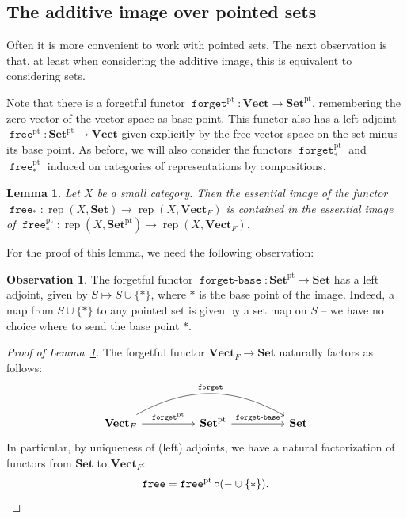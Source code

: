 \documentclass[a4paper]{amsart}
\theoremstyle{plain}
\newtheorem{lemma}[theorem]{Lemma}
\theoremstyle{definition}
\newtheorem{observation}[theorem]{Observation}
\theoremstyle{remark}
\newcommand{\funct}[1]{\operatorname{\mathtt{#1}}}
\newcommand{\Set}{\mathbf{Set}}
\newcommand{\pSet}{\mathbf{Set}^\mathrm{pt}}
\newcommand{\Vect}{\mathbf{Vect}}
\newcommand{\VectF}{\mathbf{Vect}_F}
\DeclareMathOperator{\rep}{rep}
\begin{document}
\subsection{The additive image over pointed sets} \label{subsect.pointed_sets}
Often it is more convenient to work with pointed sets. The next observation is that, at least when considering the additive image, this is equivalent to considering sets.

Note that there is a forgetful functor \( \funct{forget}^\mathrm{pt} \colon \Vect \to \pSet \), remembering the zero vector of the vector space as base point. This functor also has a left adjoint \( \funct{free}^\mathrm{pt} \colon \pSet \to \Vect \) given explicitly by the free vector space on the set minus its base point. As before, we will also consider the functors \( \funct{forget}^\mathrm{pt}_* \) and \( \funct{free}^\mathrm{pt}_* \) induced on categories of representations by compositions.

\begin{lemma} \label{obs.image_inclusion}
Let $X$ be a small category. Then the essential image of the functor \( \funct{free}_* \colon \rep(X, \Set ) \to \rep(X, \VectF) \) is contained in the essential image of \( \funct{free}^\mathrm{pt}_* \colon \rep(X, \pSet ) \to \rep(X, \VectF)\).
\end{lemma}

For the proof of this lemma, we need the following observation:

\begin{observation}
The forgetful functor \( \funct{forget-base} \colon \pSet \to \Set \) has a left adjoint, given by \( S \mapsto S \cup \{ * \} \), where \( * \) is the base point of the image. Indeed, a map from \( S \cup \{ * \} \) to any pointed set is given by a set map on \( S \) -- we have no choice where to send the base point \( * \).
\end{observation}

\begin{proof}[Proof of Lemma~\ref{obs.image_inclusion}]
The forgetful functor \( \VectF \to \Set \) naturally factors as follows:
\[ \begin{tikzcd}
\VectF \ar[rrrr, bend left, "\funct{forget}"] \ar[rr, "\funct{forget}^\mathrm{pt}"] & & \pSet \ar[rr, "\funct{forget-base}"] & & \Set
\end{tikzcd} \]
In particular, by uniqueness of (left) adjoints, we have a natural factorization of functors from \( \Set \) to \( \VectF \):
\[ \funct{free} = \funct{free}^\mathrm{pt} \circ (- \cup \{ * \}). \qedhere \]
\end{proof}
\end{document}
